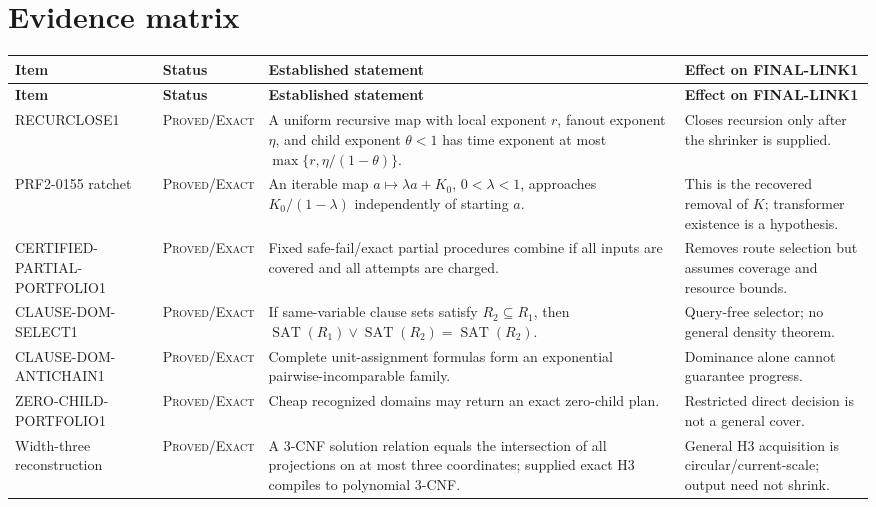 \documentclass[11pt]{article}
\newcommand{\Exact}{\textsc{Proved/Exact}}
\begin{document}
\section{Evidence matrix}

\small
\begin{longtable}{p{}p{}p{}p{}}
\toprule
\textbf{Item} & \textbf{Status} & \textbf{Established statement} & \textbf{Effect on FINAL-LINK1}\\
\midrule
\endfirsthead
\toprule
\textbf{Item} & \textbf{Status} & \textbf{Established statement} & \textbf{Effect on FINAL-LINK1}\\
\midrule
\endhead
\rowcolor{exactgreen}
RECURCLOSE1 & \Exact & A uniform recursive map with local exponent $r$, fanout exponent $\eta$, and child exponent $\theta<1$ has time exponent at most $\max\{r,\eta/(1-\theta)\}$. & Closes recursion only after the shrinker is supplied.\\
\rowcolor{exactgreen}
PRF2-0155 ratchet & \Exact & An iterable map $a\mapsto\lambda a+K_0$, $0<\lambda<1$, approaches $K_0/(1-\lambda)$ independently of starting $a$. & This is the recovered removal of $K$; transformer existence is a hypothesis.\\
\rowcolor{exactgreen}
CERTIFIED-PARTIAL-PORTFOLIO1 & \Exact & Fixed safe-fail/exact partial procedures combine if all inputs are covered and all attempts are charged. & Removes route selection but assumes coverage and resource bounds.\\
\rowcolor{exactgreen}
CLAUSE-DOM-SELECT1 & \Exact & If same-variable clause sets satisfy $R_2\subseteq R_1$, then $\operatorname{SAT}(R_1)\lor\operatorname{SAT}(R_2)=\operatorname{SAT}(R_2)$. & Query-free selector; no general density theorem.\\
\rowcolor{exactgreen}
CLAUSE-DOM-ANTICHAIN1 & \Exact & Complete unit-assignment formulas form an exponential pairwise-incomparable family. & Dominance alone cannot guarantee progress.\\
\rowcolor{exactgreen}
ZERO-CHILD-PORTFOLIO1 & \Exact & Cheap recognized domains may return an exact zero-child plan. & Restricted direct decision is not a general cover.\\
\rowcolor{exactgreen}
Width-three reconstruction & \Exact & A 3-CNF solution relation equals the intersection of all projections on at most three coordinates; supplied exact H3 compiles to polynomial 3-CNF. & General H3 acquisition is circular/current-scale; output need not shrink.\\

\end{longtable}
\end{document}
